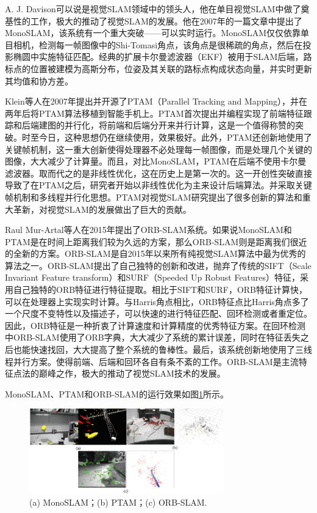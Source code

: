 
A. J. Davison可以说是视觉SLAM领域中的领头人，他在单目视觉SLAM中做了奠基性的工作，极大的推动了视觉SLAM的发展。他在2007年的一篇文章中提出了MonoSLAM，该系统有一个重大突破——可以实时运行。MonoSLAM仅仅依靠单目相机，检测每一帧图像中的Shi-Tomasi角点，该角点是很稀疏的角点，然后在投影椭圆中实施特征匹配。经典的扩展卡尔曼滤波器（EKF）被用于SLAM后端，路标点的位置被建模为高斯分布，位姿及其关联的路标点构成状态向量，并实时更新其均值和协方差。


Klein等人在2007年提出并开源了PTAM（Parallel Tracking and Mapping），并在两年后将PTAM算法移植到智能手机上。PTAM首次提出并编程实现了前端特征跟踪和后端建图的并行化，将前端和后端分开来并行计算，这是一个值得称赞的突破。时至今日，这种思想仍在继续使用，效果极好。此外，PTAM还创新地使用了关键帧机制，这一重大创新使得处理器不必处理每一帧图像，而是处理几个关键的图像，大大减少了计算量。而且，对比MonoSLAM，PTAM在后端不使用卡尔曼滤波器。取而代之的是非线性优化，这在历史上是第一次的。这一开创性突破直接导致了在PTAM之后，研究者开始以非线性优化为主来设计后端算法。并采取关键帧机制和多线程并行化思想。PTAM对视觉SLAM研究提出了很多创新的算法和重大革新，对视觉SLAM的发展做出了巨大的贡献。


Raul Mur-Artal等人在2015年提出了ORB-SLAM系统。如果说MonoSLAM和PTAM是在时间上距离我们较为久远的方案，那么ORB-SLAM则是距离我们很近的全新的方案。ORB-SLAM是自2015年以来所有纯视觉SLAM算法中最为优秀的算法之一。ORB-SLAM提出了自己独特的创新和改进，抛弃了传统的SIFT（Scale Invariant Feature transform）和SURF（Speeded Up Robust Features）特征，采用自己独特的ORB特征进行特征提取。相比于SIFT和SURF，ORB特征计算快，可以在处理器上实现实时计算。与Harris角点相比，ORB特征点比Harris角点多了一个尺度不变特性以及描述子，可以快速的进行特征匹配、回环检测或者重定位。因此，ORB特征是一种折衷了计算速度和计算精度的优秀特征方案。在回环检测中ORB-SLAM使用了ORB字典，大大减少了系统的累计误差，同时在特征丢失之后也能快速找回，大大提高了整个系统的鲁棒性。最后，该系统创新地使用了三线程并行方案。使得前端、后端和回环各自有条不紊的工作。ORB-SLAM是主流特征点法的巅峰之作，极大的推动了视觉SLAM技术的发展。

MonoSLAM、PTAM和ORB-SLAM的运行效果如图\ref{fig1_1}所示。

\begin{figure}[h]\setlength{\belowcaptionskip}{-12pt}
	\centering
	\includegraphics[width=0.75\textwidth]{figures/chapter1/fig1_1}
	\caption{(a) MonoSLAM；(b) PTAM；(c) ORB-SLAM.}\label{fig1_1}
\end{figure}

